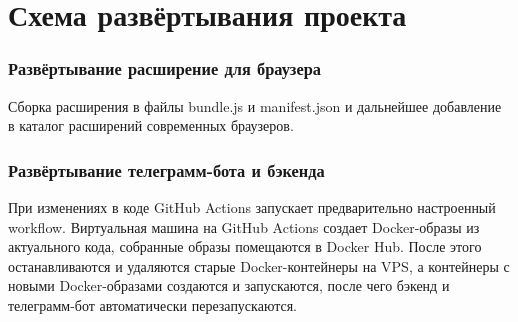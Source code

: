 	\section{Схема развёртывания проекта}
		\subsubsection{Развёртывание расширение для браузера}
			Сборка расширения в файлы bundle.js и manifest.json и дальнейшее добавление в каталог расширений современных браузеров.
		\subsubsection{Развёртывание телеграмм-бота и бэкенда}
			При изменениях в коде GitHub Actions запускает предварительно настроенный workflow. Виртуальная 	машина на GitHub Actions создает Docker-образы из актуального кода, собранные образы помещаются в Docker Hub. После этого останавливаются и удаляются старые Docker-контейнеры на VPS, а контейнеры 
			с новыми Docker-образами создаются и запускаются, после чего бэкенд и телеграмм-бот автоматически перезапускаются.
